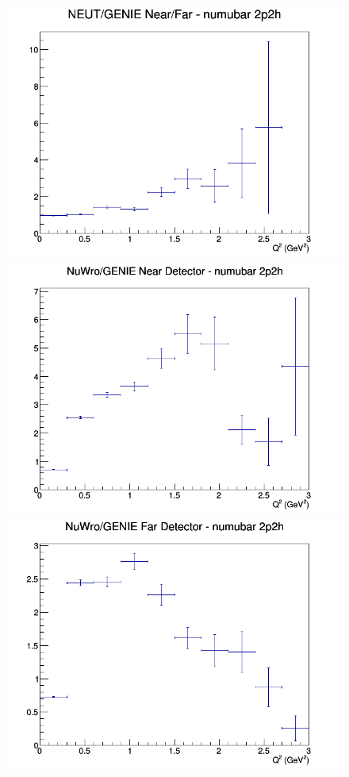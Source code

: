 \documentclass[12pt]{article}
\begin{document}
\begin{figure}[h]
\endminipage
{}
\includegraphics[width=\linewidth]{eff_Q2/LAr/ratios/2p2h_NEUT_GENIE_numubar_NF_Q2.png}
\endminipage
\newline
{}
\includegraphics[width=\linewidth]{eff_Q2/LAr/ratios/2p2h_NuWro_GENIE_numubar_near_Q2.png}
\endminipage
{}
\includegraphics[width=\linewidth]{eff_Q2/LAr/ratios/2p2h_NuWro_GENIE_numubar_far_Q2.png}

\end{figure}
\end{document}
